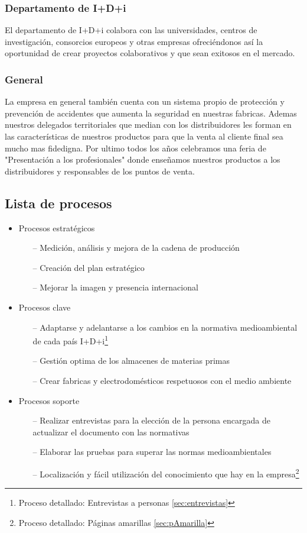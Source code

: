 \documentclass[twoside]{article}
\begin{document}
\subsubsection{Departamento de I+D+i}
El departamento de I+D+i colabora con las universidades, centros de investigación, consorcios europeos y otras empresas ofreciéndonos así la oportunidad de crear proyectos colaborativos y que sean exitosos en el mercado.

\subsubsection{General}
La empresa en general también cuenta con un sistema propio de protección y prevención de accidentes que aumenta la seguridad en nuestras fabricas. Ademas nuestros delegados territoriales que median con los distribuidores les forman en las características de nuestros productos para que la venta al cliente final sea mucho mas fidedigna. Por ultimo todos los años celebramos una feria de "Presentación a los profesionales" donde enseñamos nuestros productos a los distribuidores y responsables de los puntos de venta.

\subsection{Lista de procesos}

\begin{itemize}
	\item Procesos estratégicos
	\begin{itemize}
		\item[--] Medición, análisis y mejora de la cadena de producción
		\item[--] Creación del plan estratégico
		\item[--] Mejorar la imagen y presencia internacional
	\end{itemize}
	\item Procesos clave
	\begin{itemize}
		\item[--] Adaptarse y adelantarse a los cambios en la normativa medioambiental de cada país I+D+i\footnote{Proceso detallado: Entrevistas a personas \ref{sec:entrevistas}}
		\item[--] Gestión optima de los almacenes de materias primas
		\item[--] Crear fabricas y electrodomésticos respetuosos con el medio ambiente
	\end{itemize}
	\item Procesos soporte
	\begin{itemize}
		\item[--] Realizar entrevistas para la elección de la persona encargada de actualizar el documento con las normativas
		\item[--] Elaborar las pruebas para superar las normas medioambientales
		\item[--] Localización y fácil utilización del conocimiento que hay en la empresa\footnote{Proceso detallado: Páginas amarillas \ref{sec:pAmarilla}}
	\end{itemize}
\end{itemize}
\end{document}

